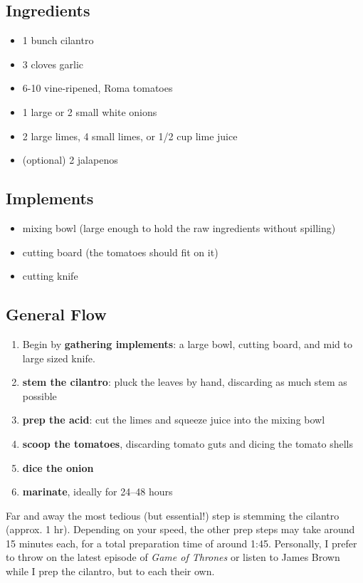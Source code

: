 \subsection{Ingredients} \begin{itemize}
    \item 1 bunch cilantro
    \item 3 cloves garlic
    \item 6-10 vine-ripened, Roma tomatoes
    \item 1 large or 2 small white onions
    \item 2 large limes, 4 small limes, or 1/2 cup lime juice
    \item (optional) 2 jalapenos
\end{itemize}

\subsection{Implements} \begin{itemize}
    \item mixing bowl (large enough to hold the raw ingredients without spilling)
    \item cutting board (the tomatoes should fit on it)
    \item cutting knife
\end{itemize}

\subsection{General Flow} \begin{enumerate}
    \item Begin by \textbf{gathering implements}: a large bowl, cutting board, and mid to large sized knife.
    \item \textbf{stem the cilantro}: pluck the leaves by hand, discarding as much stem as possible
    \item \textbf{prep the acid}: cut the limes and squeeze juice into the mixing bowl
    \item \textbf{scoop the tomatoes}, discarding tomato guts and dicing the tomato shells
    \item \textbf{dice the onion}
    \item \textbf{marinate}, ideally for 24--48 hours
\end{enumerate}

Far and away the most tedious (but essential!) step is stemming the cilantro (approx. 1 hr). Depending on your speed, the other prep steps may take around 15 minutes each, for a total preparation time of around 1:45. Personally, I prefer to throw on the latest episode of \textit{Game of Thrones} or listen to James Brown while I prep the cilantro, but to each their own.

